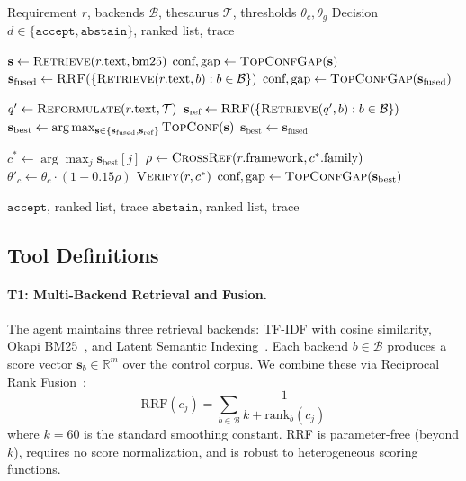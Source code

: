 \documentclass{sn-jnl}
\begin{document}
\begin{algorithm}[t]
\caption{RAA Reasoning Loop}
\label{alg:agent}
\begin{algorithmic}[1]
\REQUIRE Requirement $r$, backends $\mathcal{B}$, thesaurus $\mathcal{T}$, thresholds $\theta_c, \theta_g$
\ENSURE Decision $d \in \{\texttt{accept}, \texttt{abstain}\}$, ranked list, trace

\STATE $\mathbf{s} \gets \textsc{Retrieve}(r.\text{text}, \text{bm25})$ 
\STATE $\text{conf}, \text{gap} \gets \textsc{TopConfGap}(\mathbf{s})$
\STATE $\mathbf{s}_{\text{fused}} \gets \textsc{RRF}(\{\textsc{Retrieve}(r.\text{text}, b) : b \in \mathcal{B}\})$ 
\STATE $\text{conf}, \text{gap} \gets \textsc{TopConfGap}(\mathbf{s}_{\text{fused}})$

    \STATE $q' \gets \textsc{Reformulate}(r.\text{text}, \mathcal{T})$ 
    \STATE $\mathbf{s}_{\text{ref}} \gets \textsc{RRF}(\{\textsc{Retrieve}(q', b) : b \in \mathcal{B}\})$
    \STATE $\mathbf{s}_{\text{best}} \gets \arg\max_{\mathbf{s} \in \{\mathbf{s}_{\text{fused}}, \mathbf{s}_{\text{ref}}\}} \textsc{TopConf}(\mathbf{s})$
\ELSE
    \STATE $\mathbf{s}_{\text{best}} \gets \mathbf{s}_{\text{fused}}$
\ENDIF

\STATE $c^* \gets \arg\max_j \mathbf{s}_{\text{best}}[j]$
\STATE $\rho \gets \textsc{CrossRef}(r.\text{framework}, c^*.\text{family})$ 
\STATE $\theta'_c \gets \theta_c \cdot (1 - 0.15\rho)$ 
\STATE $\textsc{Verify}(r, c^*)$ 
\STATE $\text{conf}, \text{gap} \gets \textsc{TopConfGap}(\mathbf{s}_{\text{best}})$

    \RETURN $\texttt{accept}$, ranked list, trace
\ELSE
    \RETURN $\texttt{abstain}$, ranked list, trace
\ENDIF
\end{algorithmic}
\end{algorithm}


\subsection{Tool Definitions}

\paragraph{T1: Multi-Backend Retrieval and Fusion.}
The agent maintains three retrieval backends: TF-IDF with cosine similarity, Okapi BM25~\cite{Robertson2009}, and Latent Semantic Indexing~\cite{MarcusMaletic2003}.
Each backend $b \in \mathcal{B}$ produces a score vector $\mathbf{s}_b \in \mathbb{R}^m$ over the control corpus.
We combine these via Reciprocal Rank Fusion~\cite{Cormack2009}:
\begin{equation}
\text{RRF}(c_j) = \sum_{b \in \mathcal{B}} \frac{1}{k + \text{rank}_b(c_j)}
\end{equation}
where $k = 60$ is the standard smoothing constant.
RRF is parameter-free (beyond $k$), requires no score normalization, and is robust to heterogeneous scoring functions.
\end{document}
